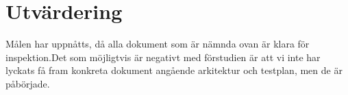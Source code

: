 \section{Utvärdering}
Målen har uppnåtts, då alla dokument som är nämnda ovan är klara för inspektion.Det som möjligtvis är negativt med förstudien är att vi inte har lyckats få fram konkreta dokument angående arkitektur och testplan, men de är påbörjade.